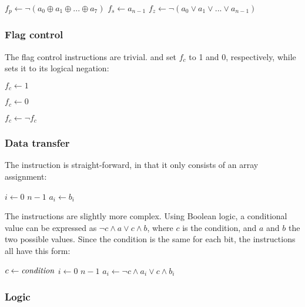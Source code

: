 \documentclass[a4paper,11pt]{kth-mag}
\renewcommand{\gets}{\leftarrow}
\newcommand{\AND}{\land}
\newcommand{\IOR}{\lor}
\newcommand{\XOR}{\oplus}
\newcommand{\NOT}{\lnot}
\begin{document}
\begin{codebox}
\zi $f_p \gets \NOT(a_0 \XOR a_1 \XOR ... \XOR a_7)$
\zi $f_s \gets a_{n-1}$
\zi $f_z \gets \NOT(a_0 \IOR a_1 \IOR ... \IOR a_{n-1})$
\end{codebox}

\subsubsection{Flag control}

The flag control instructions are trivial.
 and  set $f_c$ to 1 and 0, respectively, while  sets it to its logical negation:

\begin{codebox}
\zi $f_c \gets 1$
\end{codebox}

\begin{codebox}
\zi $f_c \gets 0$
\end{codebox}

\begin{codebox}
\zi $f_c \gets \NOT f_c$
\end{codebox}

\subsubsection{Data transfer}

The  instruction is straight-forward, in that it only consists of an array assignment:

\begin{codebox}
\zi \For $i \gets 0$ \To $n-1$
\zi \Do
      $a_i \gets b_i$
    \End
\end{codebox}

The  instructions are slightly more complex.
Using Boolean logic, a conditional value can be expressed as $\NOT c \AND a \IOR c \AND b$, where $c$ is the condition, and $a$ and $b$ the two possible values.
Since the condition is the same for each bit, the  instructions all have this form:

\begin{codebox}
\zi $c \gets \id{condition}$
\zi \For $i \gets 0$ \To $n-1$
\zi \Do
      $a_i \gets \NOT c \AND a_i \IOR c \AND b_i$
    \End
\end{codebox}

\subsubsection{Logic}
\end{document}
